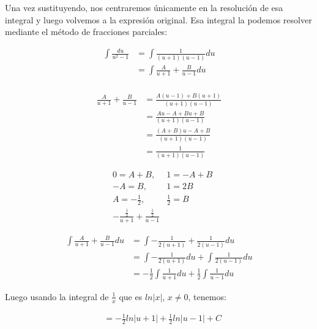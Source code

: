 \documentclass{report}
\begin{document}
\begin{enumerate}
        Una vez sustituyendo, nos centraremos únicamente en la resolución de esa integral y luego volvemos a la expresión original. Esa integral la podemos resolver mediante el método de fracciones parciales:
        
        \begin{align*}
        \int{\frac{du}{u^2-1}} &= \int{\frac{1}{\left(u+1\right)\left(u-1\right)}du} \\
        &= \int{\frac{A}{u+1}+\frac{B}{u-1}du} \\
        \end{align*}
        
        \begin{align*}
        \frac{A}{u+1}+\frac{B}{u-1} &= \frac{A\left(u-1\right)+B\left(u+1\right)}{\left(u+1\right)\left(u-1\right)} \\
        &= \frac{Au-A+Bu+B}{\left(u+1\right)\left(u-1\right)} \\
        &= \frac{\left(A+B\right)u-A+B}{\left(u+1\right)\left(u-1\right)} \\
        &= \frac{1}{\left(u+1\right)\left(u-1\right)}
        \end{align*}
        
        \begin{align*}
        &0=A+B, &1=-A+B \\
        &-A=B, &1=2B \\
        &A=-\frac{1}{2}, &\frac{1}{2}=B \\
        &-\frac{\frac{1}{2}}{u+1}+\frac{\frac{1}{2}}{u-1}
        \end{align*}
        
        \begin{align*}
        \int{\frac{A}{u+1}+\frac{B}{u-1}du}&=\int{-\frac{1}{2\left(u+1\right)}+\frac{1}{2\left(u-1\right)}du} \\
        &=\int{-\frac{1}{2\left(u+1\right)}du}+\int{\frac{1}{2\left(u-1\right)}du} \\
        &=-\frac{1}{2}\int{\frac{1}{u+1}du}+\frac{1}{2}\int{\frac{1}{u-1}du}
        \end{align*}
        
        Luego usando la integral de $\frac{1}{x}$ que es $ln{\left|x\right|}$, $x\neq0$, tenemos:
        
        \begin{align*}
        &=-\frac{1}{2}ln{\left|u+1\right|}+\frac{1}{2}ln{\left|u-1\right|}+C
        \end{align*}
        

\end{enumerate}
\end{document}
